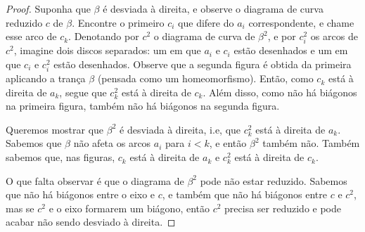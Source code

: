 	\begin{proof}
		Suponha que $\beta$ é desviada à direita, e observe o diagrama de curva reduzido $c$ de $\beta$. 
		Encontre o primeiro $c_i$ que difere do $a_i$ correspondente, e chame esse arco de $c_k$. 
		Denotando por $c^2$ o diagrama de curva de $\beta^2$, e por $c_i^2$ os arcos de $c^2$, 
		imagine dois discos separados: um em que $a_i$ e $c_i$ estão desenhados e um em que 
		$c_i$ e $c_i^2$ estão desenhados. Observe que a segunda figura é obtida da primeira 
		aplicando a trança $\beta$ (pensada como um homeomorfismo). Então, como $c_k$ está à 
		direita de $a_k$, segue que $c_k^2$ está à direita de $c_k$. Além disso, como não há 
		biágonos na primeira figura, também não há biágonos na segunda figura.
		
		\par\vspace{0.3cm} Queremos mostrar que $\beta^2$ é desviada à direita, i.e, que $c_k^2$ 
		está à direita de $a_k$. Sabemos que $\beta$ não afeta os arcos $a_i$ para $i<k$, e 
		então $\beta^2$ também não. Também sabemos que, nas figuras, $c_k$ está à direita de 
		$a_k$ e $c_k^2$ está à direita de $c_k$.
		
		\par\vspace{0.3cm} O que falta observar é que o diagrama de $\beta^2$ pode não estar reduzido. 
		Sabemos que não há biágonos entre o eixo e $c$, e também que não há biágonos entre $c$ e $c^2$, 
		mas se $c^2$ e o eixo formarem um biágono, então $c^2$ precisa ser reduzido e pode acabar não 
		sendo desviado à direita.
		

\end{proof}

